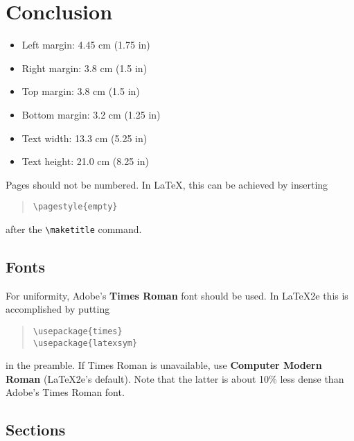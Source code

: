\documentclass[]{article}
\begin{document}
\section{Conclusion}

  

\begin{itemize}
\item Left margin: 4.45 cm (1.75 in)
\item Right margin: 3.8 cm (1.5 in)
\item Top margin: 3.8 cm (1.5 in)
\item Bottom margin: 3.2 cm (1.25 in)
\item Text width: 13.3 cm (5.25 in)
\item Text height: 21.0 cm (8.25 in)
\end{itemize}

Pages should not be numbered. In LaTeX, this can be achieved by
inserting  
\begin{quote}
\begin{verbatim}
\pagestyle{empty}
\end{verbatim}
\end{quote}
after the \verb=\maketitle= command.

\subsection{Fonts}

For uniformity, Adobe's {\bf Times Roman} font should be
used. In \LaTeX2e{} this is accomplished by putting

\begin{quote}
\begin{verbatim}
\usepackage{times}
\usepackage{latexsym}
\end{verbatim}
\end{quote}
in the preamble. If Times Roman is unavailable, use {\bf Computer
  Modern Roman} (\LaTeX2e{}'s default).  Note that the latter is about
  10\% less dense than Adobe's Times Roman font.



\subsection{Sections}
\end{document}
